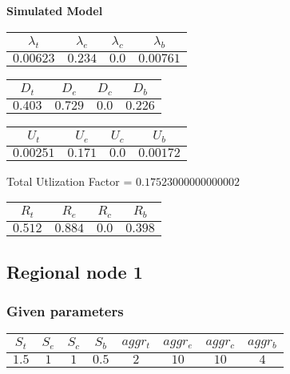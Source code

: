 \documentclass{article}
\begin{document}
\begin{minipage}{0.5\textwidth}
\centering	\textbf{Simulated Model}
\begin{table}[H]
\centering
\begin{tabular}{@{}cccc@{}}
\toprule
$\lambda_t$ & $\lambda_e$ & $\lambda_c$ & $\lambda_b$\\
\midrule
$0.00623$ & $0.234$ & $0.0$ & $0.00761$\\
\bottomrule
\end{tabular}
\end{table}
\begin{table}[H]
\centering
\begin{tabular}{@{}cccc@{}}
\toprule
$D_t$ & $D_e$ & $D_c$ & $D_b$\\
\midrule
$0.403$ & $0.729$ & $0.0$ & $0.226$\\
\bottomrule
\end{tabular}
\end{table}\begin{table}[H]
\centering
\begin{tabular}{@{}cccc@{}}
\toprule
$U_t$ & $U_e$ & $U_c$ & $U_b$\\
\midrule
$0.00251$ & $0.171$ & $0.0$ & $0.00172$\\
\bottomrule
\end{tabular}
\end{table}
\centering Total Utlization Factor = $0.17523000000000002$
\begin{table}[H]
\centering
\begin{tabular}{@{}cccc@{}}
\toprule
$R_t$ & $R_e$ & $R_c$ & $R_b$\\
\midrule
$0.512$ & $0.884$ & $0.0$ & $0.398$\\
\bottomrule
\end{tabular}
\end{table}
\end{minipage}
\newpage\subsection{Regional node 1}
\subsubsection{Given parameters}
\begin{table}[H]
\centering
\begin{tabular}{@{}cccc|cccc@{}}
\toprule
$S_t$ & $S_e$ & $S_c$ & $S_b$ & $aggr_t$ & $aggr_e$ & $aggr_c$ & $aggr_b$\\
\midrule
$1.5$ & $1$ & $1$ & $0.5$ & $2$ & $10$ & $10$ & $4$\\
\bottomrule
\end{tabular}
\end{table}
\end{document}
